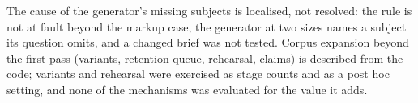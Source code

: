 The cause of the generator's missing subjects is localised, not resolved: the rule is not at fault
beyond the markup case, the generator at two sizes names a subject its question omits, and a changed
brief was not tested. Corpus expansion beyond the first pass (variants, retention queue,
rehearsal, claims) is described from the code; variants and rehearsal were exercised as stage
counts and as a post hoc setting, and none of the mechanisms was evaluated for the value it adds.


